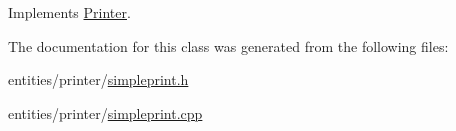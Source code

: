 Implements \hyperlink{class_printer_a66ecfd99bb8bc0a88ed0fc1276c70e23}{Printer}.



The documentation for this class was generated from the following files\-:\begin{DoxyCompactItemize}
\item 
entities/printer/\hyperlink{simpleprint_8h}{simpleprint.\-h}\item 
entities/printer/\hyperlink{simpleprint_8cpp}{simpleprint.\-cpp}\end{DoxyCompactItemize}

